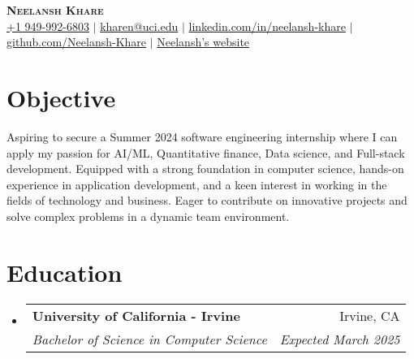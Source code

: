 \documentclass[letterpaper,11pt]{article}
\makeatletter
\newcommand{\resumeSubheading}[4]{
  \vspace{-2pt}\item
    \begin{tabular*}{0.97\textwidth}[t]{l@{\extracolsep{\fill}}r}
      \textbf{#1} & #2 \\
      \textit{\small#3} & \textit{\small #4} \\
    \end{tabular*}\vspace{-7pt}
}
\newcommand{\resumeSubHeadingListStart}{\begin{itemize}[leftmargin=0.15in, label={}]}
\newcommand{\resumeSubHeadingListEnd}{\end{itemize}}
\makeatother
\begin{document}
\begin{center}  
    \textbf{\Huge \scshape Neelansh Khare} \\ \vspace{1pt}
    \color{blue}
    \small \href{tel:19499926803}{{+1 949-992-6803}} $|$ \href{mailto:kharen@uci.edu}{{kharen@uci.edu}} $|$ 
    \href{https://linkedin.com/in/neelansh-khare}{{linkedin.com/in/neelansh-khare}} $|$
    \href{https://github.com/Neelansh-Khare}{{github.com/Neelansh-Khare}} $|$
    \href{https://neelanshkhare.notion.site/d518ba0af3604c1189da03c6ab047f3c}{{Neelansh's website}} 
\end{center}

\section{Objective}
\begin{itemize}[leftmargin=0.15in, label={}]
  \small{\item{
   \textbf{}{Aspiring to secure a Summer 2024 software engineering internship where I can apply my passion for AI/ML, Quantitative finance, Data science, and Full-stack development. Equipped with a strong foundation in computer science, hands-on experience in application development, and a keen interest in working in the fields of technology and business. Eager to contribute on innovative projects and solve complex problems in a dynamic team environment.} \\
  }}
  \end{itemize}


\section{Education}
  \resumeSubHeadingListStart
    \resumeSubheading
      {University of California - Irvine}{Irvine, CA}
      {Bachelor of Science in Computer Science}{Expected March 2025}
  \resumeSubHeadingListEnd
  
\end{document}
